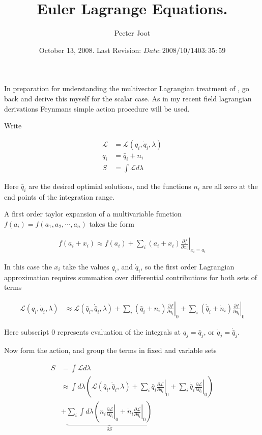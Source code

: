 \documentclass{article}
\title{Euler Lagrange Equations.}
\author{Peeter Joot}
\date{ October 13, 2008.  Last Revision: $Date: 2008/10/14 03:35:59 $ }
\newcommand{\LL}[0]{\mathcal{L}}
\newcommand{\qdot}[0]{\dot{q}}
\newcommand{\ndot}[0]{\dot{n}}
\newcommand{\qbar}[0]{\bar{q}}
\newcommand{\qdotbar}[0]{\dot{\bar{q}}}
\newcommand{\PD}[2]{\frac{\partial {#2}}{\partial {#1}}}
\begin{document}
\maketitle{}


In preparation for understanding the multivector Lagrangian treatment of
\cite{lasenby1993mda}, go back and derive this myself for the scalar
case.  As in my recent field lagrangian derivations Feynmans
\cite{feynman1963flp} simple action procedure will be used.

Write 

\begin{align*}
\LL &= \LL(q_i, \qdot_i, \lambda) \\
q_i &= \qbar_i + n_i \\
S &= \int \LL d\lambda
\end{align*}

Here $\qbar_i$ are the desired optimial solutions, and the functions $n_i$
are all zero at the end points of the integration range.

A first order taylor expansion of a multivariable function
$f(a_i) = f(a_1, a_2, \cdots, a_n)$
takes the form

\begin{align*}
f(a_i + x_i) \approx f(a_i) + \sum_i (a_i + x_i) \left. \PD{x_i}{f} \right\vert_{x_i = a_i}
\end{align*}

In this case the $x_i$ take the values $q_i$, and $\qdot_i$, so the first
order Lagrangian approximation requires summation over differential contributions for both sets of terms

\begin{align*}
\LL(q_i, \qdot_i, \lambda) 
&\approx \LL(\qbar_i, \qdotbar_i, \lambda) 
+ \sum_i (\qbar_i + n_i) \left. \PD{q_i}{f} \right\vert_0
+ \sum_i (\qdotbar_i + \ndot_i) \left. \PD{\qdot_i}{f} \right\vert_0
\end{align*}

Here subscript $0$ represents evaluation of the integrals at $q_j = \qbar_j$, 
or $\qdot_j = \qdotbar_j$.

Now form the action, and group the terms in fixed and variable sets

\begin{align*}
S &= \int \LL d\lambda \\
&\approx
\int d\lambda 
\left(
\LL(\qbar_i, \qdotbar_i, \lambda)
+ \sum_i \qbar_i \left. \PD{q_i}{\LL} \right\vert_0
+ \sum_i \qdotbar_i \left. \PD{\qdot_i}{\LL} \right\vert_0
\right) \\
&+
\underbrace{
\sum_i \int d\lambda
\left(
n_i \left. \PD{q_i}{\LL} \right\vert_0
+\ndot_i \left. \PD{\qdot_i}{\LL} \right\vert_0
\right)
}_{\delta S}
\end{align*}
\end{document}
